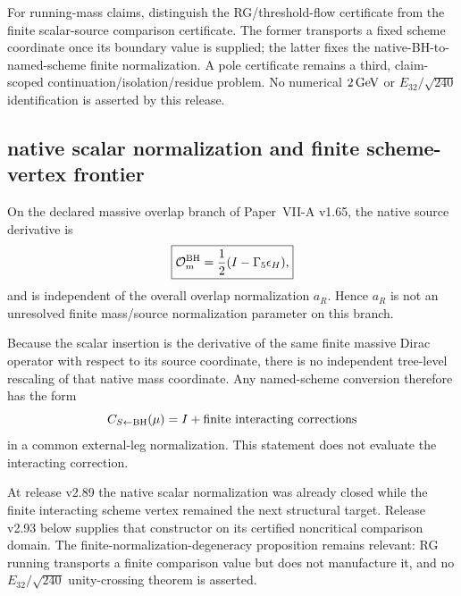 \documentclass[12pt,a4paper]{article}
\begin{document}
\begin{remark}
\label{p12:rem:v288-split-g16-frontier}
For running-mass claims, distinguish the RG/threshold-flow certificate from
the finite scalar-source comparison certificate.  The former transports a
fixed scheme coordinate once its boundary value is supplied; the latter
fixes the native-BH-to-named-scheme finite normalization.  A pole certificate
remains a third, claim-scoped continuation/isolation/residue problem.  No
numerical $2\,{\rm GeV}$ or $E_{32}/\sqrt{240}$ identification is asserted by
this release.
\end{remark}


\subsection{native scalar normalization and finite scheme-vertex frontier}
\label{p12:sec:v289-native-scalar-normalization}

\begin{proposition}
\label{p12:prop:v289-native-overlap-scalar-normalization}
On the declared massive overlap branch of Paper~VII-A v1.65, the native source
derivative is
\[
 \boxed{\mathcal O_m^{\rm BH}=\frac12(I-\Gamma_5\epsilon_H),}
\]
and is independent of the overall overlap normalization $a_R$.  Hence $a_R$
is not an unresolved finite mass/source normalization parameter on this
branch.
\end{proposition}

\begin{corollary}
\label{p12:cor:v289-tree-source-coordinate}
Because the scalar insertion is the derivative of the same finite massive
Dirac operator with respect to its source coordinate, there is no independent
tree-level rescaling of that native mass coordinate.  Any named-scheme
conversion therefore has the form
\[
 C_{S\leftarrow {\rm BH}}(\mu)=I+\text{finite interacting corrections}
\]
in a common external-leg normalization.  This statement does not evaluate the
interacting correction.
\end{corollary}

\begin{remark}
\label{p12:rem:v289-refined-g16-frontier}
At release v2.89 the native scalar normalization was already closed while the
finite interacting scheme vertex remained the next structural target.  Release
v2.93 below supplies that constructor on its certified noncritical comparison
domain.  The finite-normalization-degeneracy proposition remains relevant: RG
running transports a finite comparison value but does not manufacture it, and
no $E_{32}/\sqrt{240}$ unity-crossing theorem is asserted.
\end{remark}
\end{document}
